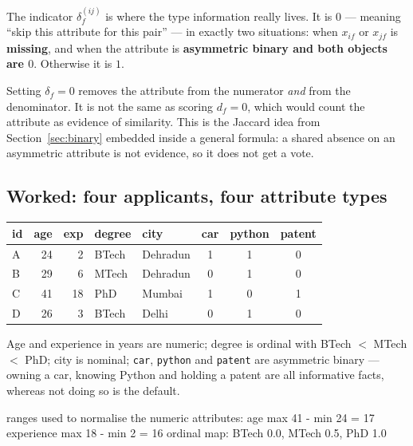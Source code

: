 \documentclass[11pt]{article}
\begin{document}
The indicator $\delta_f^{(ij)}$ is where the type information really lives.
It is $0$ --- meaning ``skip this attribute for this pair'' --- in exactly
two situations: when $x_{if}$ or $x_{jf}$ is \textbf{missing}, and when the
attribute is \textbf{asymmetric binary and both objects are $0$}. Otherwise
it is $1$.

\begin{keyidea}
Setting $\delta_f = 0$ removes the attribute from the numerator
\emph{and} from the denominator. It is not the same as scoring $d_f = 0$,
which would count the attribute as evidence of similarity. This is the
Jaccard idea from Section~\ref{sec:binary} embedded inside a general
formula: a shared absence on an asymmetric attribute is not evidence, so it
does not get a vote.
\end{keyidea}

\subsection{Worked: four applicants, four attribute types}

\begin{center}
\begin{tabular}{lrrllccc}
  \toprule
  id & age & exp & degree & city & car & python & patent \\
  \midrule
  A & 24 & 2 & BTech & Dehradun & 1 & 1 & 0 \\
  B & 29 & 6 & MTech & Dehradun & 0 & 1 & 0 \\
  C & 41 & 18 & PhD & Mumbai & 1 & 0 & 1 \\
  D & 26 & 3 & BTech & Delhi & 0 & 1 & 0 \\
  \bottomrule
\end{tabular}
\end{center}

Age and experience in years are numeric; degree is ordinal with
BTech $<$ MTech $<$ PhD; city is nominal; \texttt{car}, \texttt{python} and
\texttt{patent} are asymmetric binary --- owning a car, knowing Python and
holding a patent are all informative facts, whereas not doing so is the
default.

\begin{codeout}
ranges used to normalise the numeric attributes:
  age        max 41 - min 24 = 17
  experience max 18 - min 2 = 16
ordinal map: BTech 0.0, MTech 0.5, PhD 1.0
\end{codeout}
\end{document}
